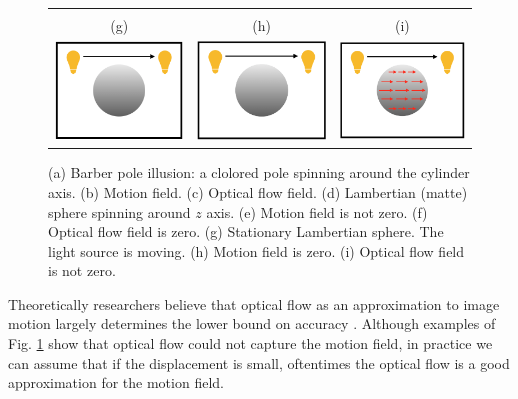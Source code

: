 \documentclass[letterpaper,11pt]{article}
\begin{document}
\begin{figure}[hbt!]
\begin{tabular}{ccc}
		\vspace{0.5cm}\\ 
		(g) & (h) & (i) \\
		\includegraphics[width=.3\textwidth]{grf/stationary-lambertian-sphere.png} &
		\includegraphics[width=.3\textwidth]{grf/stationary-lambertian-sphere-motion-field.png} &
		\includegraphics[width=.3\textwidth]{grf/stationary-lambertian-sphere-optical-flow.png}
	\end{tabular}
	\caption{(a) Barber pole illusion: a clolored pole spinning around the cylinder axis. (b) Motion field. (c) Optical flow field. (d) Lambertian (matte) sphere spinning around $z$ axis. (e) Motion field is not zero. (f) Optical flow field is zero. (g) Stationary Lambertian sphere. The light source is moving. (h) Motion field is zero. (i) Optical flow field is not zero. }
	\label{grf:motion-flow-vs-optical-flow}
\end{figure}

Theoretically researchers believe that optical flow as an approximation to image motion largely determines the lower bound
on accuracy \citep{Beauchemin:1995}. Although examples of Fig. \ref{grf:motion-flow-vs-optical-flow} show that optical flow could not capture the motion field, in practice we can assume that if the displacement is small, oftentimes the optical flow is a good approximation for the motion field. 
\end{document}
